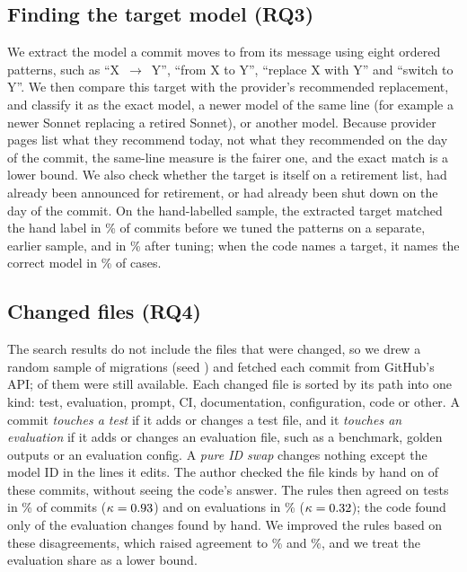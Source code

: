 \subsection{Finding the target model (RQ3)}

We extract the model a commit moves to from its message using eight ordered patterns, such as ``X~$\rightarrow$~Y'', ``from X to Y'', ``replace X with Y'' and ``switch to Y''. We then compare this target with the provider's recommended replacement, and classify it as the exact model, a newer model of the same line (for example a newer Sonnet replacing a retired Sonnet), or another model. Because provider pages list what they recommend today, not what they recommended on the day of the commit, the same-line measure is the fairer one, and the exact match is a lower bound. We also check whether the target is itself on a retirement list, had already been announced for retirement, or had already been shut down on the day of the commit. On the hand-labelled sample, the extracted target matched the hand label in \TargetCheckBefore\% of commits before we tuned the patterns on a separate, earlier sample, and in \TargetCheck\% after tuning; when the code names a target, it names the correct model in \TargetNamedRight\% of cases.

\subsection{Changed files (RQ4)}

The search results do not include the files that were changed, so we drew a random sample of \FilesSample{} migrations (seed \FilesSeed) and fetched each commit from GitHub's API; \FilesFound{} of them were still available. Each changed file is sorted by its path into one kind: test, evaluation, prompt, CI, documentation, configuration, code or other. A commit \emph{touches a test} if it adds or changes a test file, and it \emph{touches an evaluation} if it adds or changes an evaluation file, such as a benchmark, golden outputs or an evaluation config. A \emph{pure ID swap} changes nothing except the model ID in the lines it edits. The author checked the file kinds by hand on \FileCheckRows{} of these commits, without seeing the code's answer. The rules then agreed on tests in \FileCheckTestBefore\% of commits ($\kappa = 0.93$) and on evaluations in \FileCheckEvalBefore\% ($\kappa = 0.32$); the code found only \FileCheckEvalBeforeFound{} of the \FileCheckEvalHandYes{} evaluation changes found by hand. We improved the rules based on these disagreements, which raised agreement to \FileCheckTestAfter\% and \FileCheckEvalAfter\%, and we treat the evaluation share as a lower bound.

